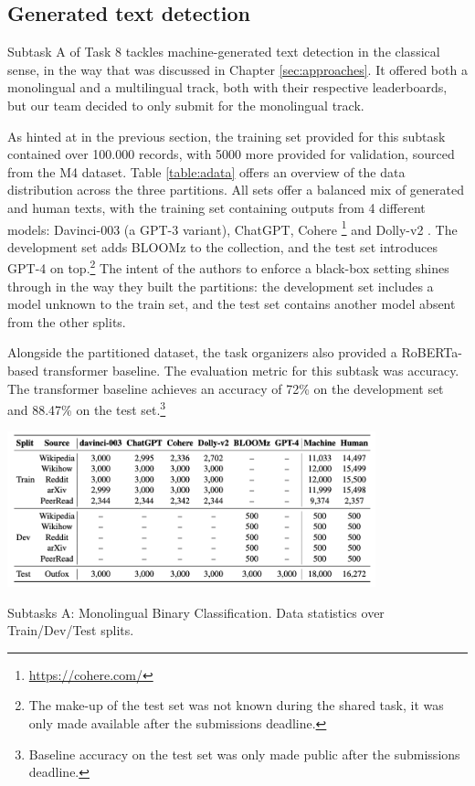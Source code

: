 \subsection{Generated text detection}
\label{subsec:subtask_a}

Subtask A of Task 8 tackles machine-generated text detection in the classical sense, in the way that was discussed in Chapter \ref{sec:approaches}.
It offered both a monolingual and a multilingual track, both with their respective leaderboards, but our team decided to only submit for the monolingual track.

As hinted at in the previous section, the training set provided for this subtask contained over 100.000 records, with 5000 more provided for validation, sourced from the M4 \citep{wang-etal-2024-m4} dataset.
Table \ref{table:adata} offers an overview of the data distribution across the three partitions.
All sets offer a balanced mix of generated and human texts, with the training set containing outputs from 4 different models: Davinci-003 (a GPT-3 variant), ChatGPT, Cohere \footnote{\url{https://cohere.com/}} and Dolly-v2 \citep{DatabricksBlog2023DollyV2}. The development set adds BLOOMz \citep{muennighoff2023crosslingualgeneralizationmultitaskfinetuning} to the collection, and the test set introduces GPT-4 on top.\footnote{The make-up of the test set was not known during the shared task, it was only made available after the submissions deadline.}
The intent of the authors to enforce a black-box setting shines through in the way they built the partitions: the development set includes a model unknown to the train set, and the test set contains another model absent from the other splits.

Alongside the partitioned dataset, the task organizers also provided a RoBERTa-based transformer baseline.
The evaluation metric for this subtask was accuracy.
The transformer baseline achieves an accuracy of 72\% on the development set and 88.47\% on the test set.\footnote{Baseline accuracy on the test set was only made public after the submissions deadline.}

\begin{table}[ht]
    \centering
    \includegraphics[width=0.8\textwidth]{assets/subtaska-data.png}
    \caption{Subtasks A: Monolingual Binary Classification. Data statistics over Train/Dev/Test splits.}
    \label{table:adata}
\end{table}

